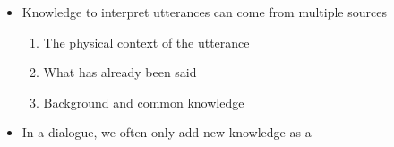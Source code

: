 \documentclass[headrule,footrule]{foils}
\begin{document}
\begin{itemize}
\item Knowledge to interpret utterances can come from multiple sources
  \begin{enumerate}
  \item The physical context of the utterance
    \\ 
  \item What has already been said
    \\ 
  \item Background and common knowledge
    \\ 
  \end{enumerate}
\item In a dialogue, we often only add new knowledge as a 
  \begin{exe}
    \ex 
    \begin{xlist}
      \ex {}
      \ex {}
  \end{xlist}
\end{exe}
\end{itemize}






\end{document}
